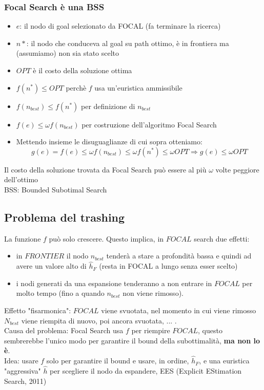 \documentclass{article}
\begin{document}
\subsubsection{Focal Search è una BSS}
\begin{itemize}
\item $e$: il nodo di goal selezionato da FOCAL (fa terminare la ricerca)
\item $n*$: il nodo che conduceva al goal su path ottimo, è in frontiera ma (assumiamo) non sia stato scelto
\item $OPT$ è il costo della soluzione ottima
\item $f(n^*)\leq OPT$ perchè $f$ usa un'euristica ammissibile
\item $f(n_{best}) \leq f(n^*)$ per definizione di $n_{best}$
\item $f(e)\leq \omega f(n_{best})$ per costruzione dell'algoritmo Focal Search
\item Mettendo insieme le disuguaglianze di cui sopra otteniamo: \[ g(e)=f(e)\leq \omega f(n_{best})\leq\omega f(n^*) \leq \omega OPT \Rightarrow g(e) \leq \omega OPT \]
\end{itemize}
Il costo della soluzione trovata da Focal Search può essere al più $\omega$ volte peggiore dell'ottimo
\\ BSS: Bounded Subotimal Search
\subsection{Problema del trashing}
La funzione $f$ può solo crescere. Questo implica, in $FOCAL$ search due effetti:
\begin{itemize}
    \item in $FRONTIER$ il nodo $n_{best}$ tenderà a stare a profondità bassa e quindi ad avere un valore alto di $\hat{h}_F$ (resta in FOCAL a lungo senza esser scelto)
    \item i nodi generati da una espansione tenderanno a non entrare in $FOCAL$ per molto tempo (fino a quando $n_{best}$ non viene rimosso).
\end{itemize}
Effetto "fisarmonica": $FOCAL$ viene svuotata, nel momento in cui viene rimosso $N_{best}$ viene riempita di nuovo, poi ancora svuotata, ... .
\\ Causa del problema: Focal Search usa $f$ per riempire $FOCAL$, questo sembrerebbe l'unico modo per garantire il bound della subottimalità, \textbf{ma non lo è}.
\\ Idea: usare $f$ solo per garantire il bound e usare, in ordine, $\hat{h}_F$, e una euristica "aggressiva" $\hat{h}$ per scegliere il nodo da espandere, EES (Explicit EStimation Search, 2011)
\end{document}
